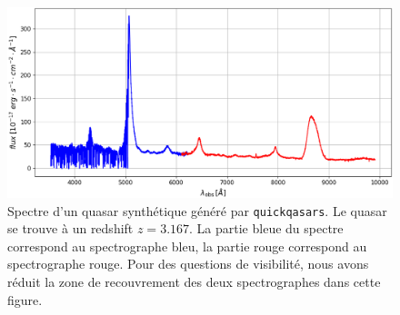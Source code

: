 \begin{figure}
  \centering
  \includegraphics[scale=0.42]{quickquasars_spectrum}
  \caption{Spectre d'un quasar synthétique généré par \texttt{quickqasars}. Le quasar se trouve à un redshift $z = \num{3.167}$. La partie bleue du spectre correspond au spectrographe bleu, la partie rouge correspond au spectrographe rouge. Pour des questions de visibilité, nous avons réduit la zone de recouvrement des deux spectrographes dans cette figure.}
  \label{fig:quickquasars_spectrum}
\end{figure}


